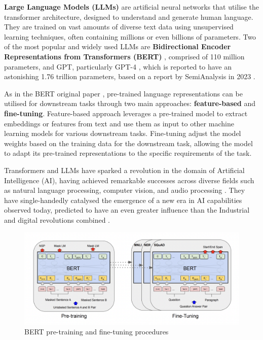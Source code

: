 \textbf{Large Language Models (LLMs)} are artificial neural networks that utilise the transformer architecture, designed to understand and generate human language. They are trained on vast amounts of diverse text data using unsupervised learning techniques, often containing millions or even billions of parameters. Two of the most popular and widely used LLMs are \textbf{Bidirectional Encoder Representations from Transformers (BERT)} \cite{devlin-2019-bert}, comprised of 110 million parameters, and GPT, particularly GPT-4 \cite{openai-2024-gpt4}, which is reported to have an astonishing 1.76 trillion parameters, based on a report by SemiAnalysis in 2023 \cite{semianalysis-gpt4}.

As in the BERT original paper \cite{devlin-2019-bert}, pre-trained language representations can be utilised for downstream tasks through two main approaches: \textbf{feature-based} and \textbf{fine-tuning}. Feature-based approach \cite{devlin-2019-bert} leverages a pre-trained model to extract embeddings or features from text and use them as input to other machine learning models for various downstream tasks. Fine-tuning \cite{devlin-2019-bert} adjust the model weights based on the training data for the downstream task, allowing the model to adapt its pre-trained representations to the specific requirements of the task.

Transformers and LLMs have sparked a revolution in the domain of Artificial Intelligence (AI), having achieved remarkable successes across diverse fields such as natural language processing, computer vision, and audio processing \cite{lin-2022-survey-transformers}. They have single-handedly catalysed the emergence of a new era in AI capabilities observed today, predicted to have an even greater influence than the Industrial and digital revolutions combined \cite{makridakis-2017-ai-revolution}.

\begin{figure}[htbp]
    \centering
    \includegraphics[width=0.9\linewidth]{images/bert_finetuning.png}
    \caption{BERT pre-training and fine-tuning procedures \cite{devlin-2019-bert}}
    \label{fig:bert_finetuning}
\end{figure}

